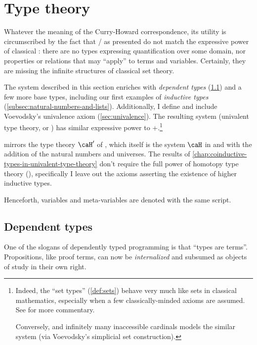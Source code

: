\documentclass[./thesis.tex]{subfiles}
\begin{document}
\chapter{Type theory}
\label{chap:type-theory}

Whatever the meaning of the Curry-Howard correspondence, its utility is
circumscribed by the fact that \IPL{}/\TLC{} as
presented do not match the expressive power of classical \FOL{}:
there are no types expressing quantification over some domain, nor properties
or relations that may ``apply'' to terms and variables. Certainly, they are
missing the infinite structures of classical set theory.

The system described in this section enriches \TLC{} with
\textit{dependent types} (\cref{sec:dependent-types}) and a few more base types,
including our first examples of \textit{inductive types}
(\cref{subsec:natural-numbers-and-lists}). Additionally, I define and include
Voevodsky's univalence axiom (\cref{sec:univalence}). The
resulting system (univalent type theory, or \UTT{}) has similar
expressive power to \ZFC{}+\FOL{}.\footnote{Indeed, the
  ``set types'' (\cref{def:sets}) behave very much like sets in classical
  mathematics, especially when a few classically-minded axioms are assumed. See
  \cite{book} for more commentary.

  Conversely, \ZFC{} and infinitely many inaccessible cardinals models the
  similar system \HoTT{} (via Voevodsky's simplicial set construction).}

\UTT{} mirrors the type theory $\caH'$ of \cite{homotopy-limits}, which itself
is the system $\caH$ in \cite{inductive} and \cite{homotopy-initial} with the
addition of the natural numbers and universes. The results of
\cref{chap:coinductive-types-in-univalent-type-theory} don't
require the full power of homotopy type theory (\HoTT), specifically I leave
out the axioms asserting the existence of higher inductive types.

\begin{notation}
  Henceforth, variables and meta-variables are denoted with the same script.
\end{notation}

\section{Dependent types}
\label{sec:dependent-types}

One of the slogans of dependently typed programming is that ``types are
terms''. Propositions, like proof terms, can now be \textit{internalized} and
subsumed as objects of study in their own right.
\end{document}
